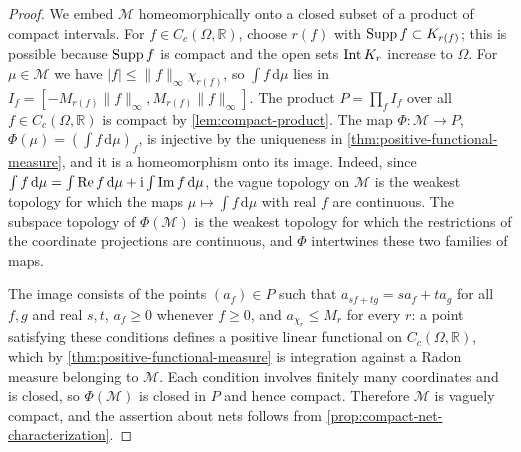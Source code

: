 \begin{proof}
We embed $\mathcal M$ homeomorphically onto a closed subset of a product of compact intervals. For $f\in C_c(\Omega,\mathbb R)$, choose $r(f)$ with $\operatorname{Supp} f\subset K_{r(f)}$; this is possible because $\operatorname{Supp} f$ is compact and the open sets $\operatorname{Int} K_r$ increase to $\Omega$. For $\mu\in\mathcal M$ we have $|f|\leq\|f\|_\infty\chi_{r(f)}$, so $\int f\,\mathrm d\mu$ lies in $I_f=[-M_{r(f)}\|f\|_\infty,M_{r(f)}\|f\|_\infty]$. The product $P=\prod_fI_f$ over all $f\in C_c(\Omega,\mathbb R)$ is compact by \cref{lem:compact-product}. The map $\Phi\colon\mathcal M\to P$, $\Phi(\mu)=(\int f\,\mathrm d\mu)_f$, is injective by the uniqueness in \cref{thm:positive-functional-measure}, and it is a homeomorphism onto its image. Indeed, since $\int f\,\mathrm d\mu=\int\operatorname{Re} f\,\mathrm d\mu+\mathrm i\int\operatorname{Im} f\,\mathrm d\mu$, the vague topology on $\mathcal M$ is the weakest topology for which the maps $\mu\mapsto\int f\,\mathrm d\mu$ with real $f$ are continuous. The subspace topology of $\Phi(\mathcal M)$ is the weakest topology for which the restrictions of the coordinate projections are continuous, and $\Phi$ intertwines these two families of maps.

The image consists of the points $(a_f)\in P$ such that $a_{sf+tg}=sa_f+ta_g$ for all $f,g$ and real $s,t$, $a_f\geq0$ whenever $f\geq0$, and $a_{\chi_r}\leq M_r$ for every $r$: a point satisfying these conditions defines a positive linear functional on $C_c(\Omega,\mathbb R)$, which by \cref{thm:positive-functional-measure} is integration against a Radon measure belonging to $\mathcal M$. Each condition involves finitely many coordinates and is closed, so $\Phi(\mathcal M)$ is closed in $P$ and hence compact. Therefore $\mathcal M$ is vaguely compact, and the assertion about nets follows from \cref{prop:compact-net-characterization}.
\end{proof}

